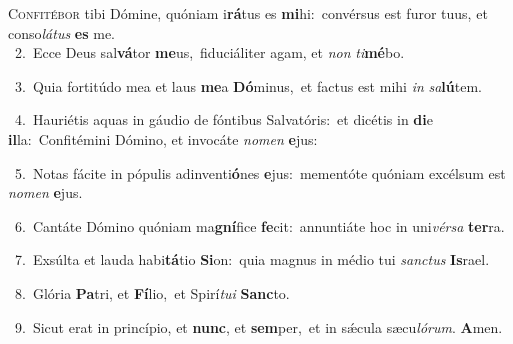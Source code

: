 \lettrine{\initial\textcolor{\initialcolor}{C}}{onfitébor} tibi Dómine, quóniam i\-\textbf{rá}\-tus es \textbf{mi}\-hi:~\star convérsus est furor tuus, et conso\-\textit{lá}\-\textit{tus} \textbf{es} me.\\
{\numbfont\textcolor{\numbcolor}{~2.}}~Ecce Deus sal\-\textbf{vá}\-tor \textbf{me}\-us,~\star fiduciáliter agam, et \textit{non} \textit{ti}\-\textbf{mé}bo.\par
{\numbfont\textcolor{\numbcolor}{~3.}}~Quia fortitúdo mea et laus \textbf{me}\-a \textbf{Dó}\-minus,~\star et factus est mihi \textit{in} \textit{sa}\-\textbf{lú}tem.\par
{\numbfont\textcolor{\numbcolor}{~4.}}~Hauriétis aquas in gáudio de fóntibus Salvatóris:~\dagger et dicétis in \textbf{di}\-e \textbf{il}\-la:~\star Confitémini Dómino, et invocáte \textit{no}\-\textit{men} \textbf{e}\-jus:\par
{\numbfont\textcolor{\numbcolor}{~5.}}~Notas fácite in pópulis adinventi\-\textbf{ó}\-nes \textbf{e}\-jus:~\star mementóte quóniam excélsum est \textit{no}\-\textit{men} \textbf{e}\-jus.\par
{\numbfont\textcolor{\numbcolor}{~6.}}~Cantáte Dómino quóniam ma\-\textbf{gní}\-fice \textbf{fe}\-cit:~\star annuntiáte hoc in uni\-\textit{vér}\-\textit{sa} \textbf{ter}\-ra.\par
{\numbfont\textcolor{\numbcolor}{~7.}}~Exsúlta et lauda habi\-\textbf{tá}\-tio \textbf{Si}\-on:~\star quia magnus in médio tui \textit{sanc}\-\textit{tus} \textbf{Is}\-rael.\par
{\numbfont\textcolor{\numbcolor}{~8.}}~Glória \textbf{Pa}\-tri, et \textbf{Fí}\-lio,~\star et Spirí\-\textit{tu}\-\textit{i} \textbf{Sanc}\-to.\par
{\numbfont\textcolor{\numbcolor}{~9.}}~Sicut erat in princípio, et \textbf{nunc}\-, et \textbf{sem}\-per,~\star et in sǽcula sæcu\-\textit{ló}\-\textit{rum}. \textbf{A}\-men.\par
